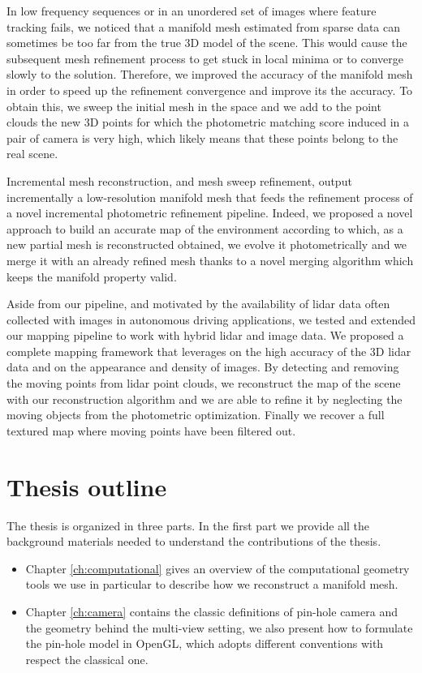 In low frequency sequences or in an unordered set of images where feature tracking fails, we noticed that a manifold mesh estimated from sparse data can sometimes be too far from the true 3D model of the scene. This would cause the subsequent mesh refinement process to get stuck in local minima or to converge slowly to the solution. Therefore, we improved the accuracy of the manifold mesh in order to speed up the refinement convergence and improve its the accuracy. To obtain this, we sweep the initial mesh in the space and we add to the point clouds the new 3D points for which the photometric matching score induced in a pair of camera is very high, which likely means that these points belong to the real scene.

Incremental mesh reconstruction, and mesh sweep refinement, output incrementally a low-resolution manifold mesh that feeds the refinement process of a novel incremental photometric refinement pipeline. Indeed, we proposed a novel approach to build an accurate map of the environment according to which, as a new partial mesh is reconstructed obtained, we evolve it photometrically and we merge it with an already refined mesh thanks to a novel merging algorithm which keeps the manifold property valid.

Aside from our pipeline, and motivated by the availability of lidar data often collected with images in autonomous driving applications, we tested and extended our mapping pipeline to work with hybrid lidar and image data. We proposed a complete mapping framework that leverages on the high accuracy of the 3D lidar data and on the appearance and density of images. By detecting and removing the moving points from lidar point clouds, we reconstruct the map of the scene with our reconstruction algorithm and we are able to refine it by neglecting the moving objects from the photometric optimization. Finally we recover a full textured map where moving points have been filtered out.


\section{Thesis outline}

The thesis is organized in three parts. 
In the first part we provide all the background materials needed to understand the contributions of the thesis.
\begin{itemize}
 \item Chapter \ref{ch:computational} gives an overview of the computational geometry tools we use in particular to describe how we reconstruct a manifold mesh.
 \item Chapter \ref{ch:camera} contains the classic definitions of pin-hole camera and the geometry behind the  multi-view setting, we also present how to formulate the pin-hole model in OpenGL, which adopts different conventions with respect the classical one.
\end{itemize}



